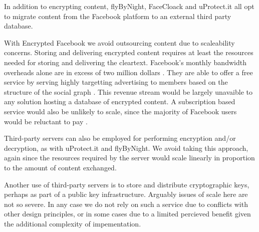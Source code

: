 
In addition to encrypting content, flyByNight, FaceCloack and uProtect.it all opt to migrate content from the Facebook platform to an external third party database.

With Encrypted Facebook we avoid outsourcing content due to scaleability concerns. Storing and delivering encrypted content requires at least the resources needed for storing and delivering the cleartext.  Facebook's monthly bandwidth overheads alone are in excess of two million dollars \cite{fb-costs}. They are able to offer a free service by serving highly targetting advertising to members based on the structure of the social graph \cite{fb-ads}. This revenue stream would be largely unavaible to any solution hosting a database of encrypted content. A subscription based service would also be unlikely to scale, since the majority of Facebook users would be reluctant to pay \cite{fb-pay}.


Third-party servers can also be employed for performing encryption and/or decryption, as with uProtect.it and flyByNight. We avoid taking this approach, again since the resources required by the server would scale linearly in proportion to the amount of content exchanged.

Another use of third-party servers is to store and distribute cryptographic keys, perhaps as part of a public key infrastructure. Arguably issues of scale here are not so severe. In any case we do not rely on such a service due to conflicts with other design principles, or in some cases due to a limited percieved benefit given the additional complexity of impementation.


